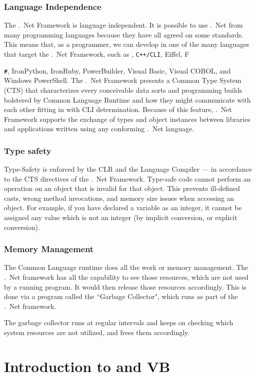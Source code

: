  \subsubsection*{Language Independence}
 The .\ Net Framework is language independent. It is possible to use .\ Net from many programming languages because they have all agreed on some standards. This means that, as a programmer, we can develop in one of the many languages that target the .\ Net Framework, such as {\cs}, \texttt{C++/CLI}, Eiffel, F{\texttt{\#}, IronPython, IronRuby, PowerBuilder, Visual Basic, Visual COBOL, and Windows PowerShell. The .\ Net Framework presents a Common Type System (CTS) that characterizes every conceivable data sorts and programming builds bolstered by Common Language Runtime and how they might communicate with each other fitting in with CLI determination. Because of this feature, .\ Net Framework supports the exchange of types and object instances between libraries and applications written using any conforming .\ Net language.
 
 \subsubsection*{Type safety}
 Type-Safety is enforced by the CLR and the Language Compiler — in accordance to the CTS directives of the .\ Net Framework. Type-safe code cannot perform an operation on an object that is invalid for that object. This prevents ill-defined casts, wrong method invocations, and memory size issues when accessing an object. For example, if you have declared a variable as an integer, it cannot be assigned any value which is not an integer (by implicit conversion, or explicit conversion).
 
 \subsubsection*{Memory Management}
 The Common Language runtime does all the work or memory management. The .\ Net framework has all the capability to see those resources, which are not used by a running program. It would then release those resources accordingly. This is done via a program called the ``Garbage Collector", which runs as part of the .\ Net framework.
	
 The garbage collector runs at regular intervals and keeps on checking which system resources are not utilized, and frees them accordingly.
 

\section{Introduction to {\cs} and VB}
}

